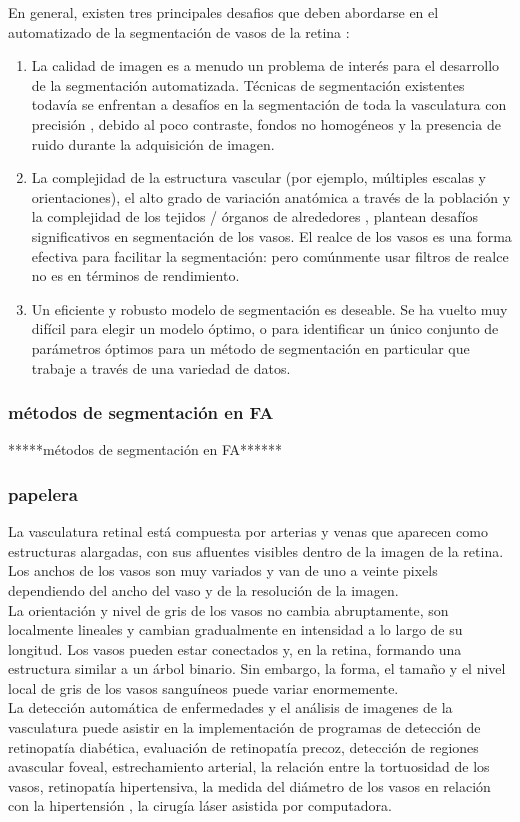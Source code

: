 En general, existen tres principales desafios que deben abordarse en el automatizado de la segmentación de vasos de la retina :
\begin{enumerate}
\item La calidad de imagen es a menudo un problema de interés para el desarrollo de la segmentación automatizada. Técnicas de segmentación existentes todavía se enfrentan a desafíos en la segmentación de toda la vasculatura con precisión , debido al poco contraste, fondos no homogéneos y la presencia de ruido durante la adquisición de imagen.
\item La complejidad de la estructura vascular (por ejemplo, múltiples escalas y orientaciones), el alto grado de variación anatómica a través de la población y la complejidad de los tejidos / órganos de alrededores
, plantean desafíos significativos en segmentación de los vasos. El realce de los vasos es
una forma efectiva para facilitar la segmentación:  pero comúnmente usar filtros de realce no es en términos de rendimiento.
\item Un eficiente y robusto modelo de segmentación  es deseable. Se ha vuelto muy difícil
para elegir un modelo óptimo, o para identificar un único conjunto de parámetros óptimos para un método de segmentación en particular que trabaje a través de una variedad de datos.\cite{zhao2015retinal}
\end{enumerate}



\subsubsection{métodos de segmentación en FA}
*****métodos de segmentación en FA******

\subsubsection{papelera}
La vasculatura retinal está compuesta por arterias y venas que aparecen como estructuras alargadas, con sus afluentes visibles dentro de la imagen de la retina.
Los anchos de los vasos son muy variados y van de uno a veinte pixels dependiendo del ancho del vaso y de la resolución de la imagen.
\\
La orientación y nivel de gris de los vasos no cambia abruptamente, son localmente lineales y cambian gradualmente en intensidad a lo largo de su longitud. Los vasos pueden estar conectados y, en la retina, formando una estructura similar a un árbol binario. Sin embargo, la forma, el tamaño y el nivel local de gris de los vasos sanguíneos puede variar enormemente.
\\
La detección automática de enfermedades y el análisis de imagenes de la vasculatura   puede asistir en la implementación de programas de detección de retinopatía diabética, evaluación de retinopatía precoz, detección de regiones avascular foveal, estrechamiento arterial, la relación entre la tortuosidad de los vasos, retinopatía hipertensiva, la medida del diámetro de los vasos en relación con la hipertensión , la cirugía láser asistida por computadora.\cite{fraz2012blood}\\
